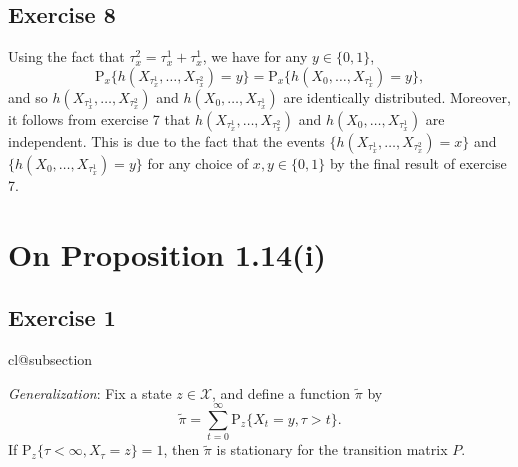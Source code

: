 \documentclass[12pt]{article}
\makeatletter
\def\nullstepcounter#1{%
	\begingroup
		\let\@elt\@stpelt
		\csname cl@#1\endcsname
	\endgroup}
\newcommand{\Prob}{\mathrm{P}}
\makeatother
\begin{document}
\subsection*{Exercise 8}

Using the fact that $\tau_x^2 = \tau_x^1 + \tau_x^1$, we have for any $y \in \{0, 1\}$,
\begin{equation*}
\Prob_x\{h(X_{\tau_x^1}, \ldots, X_{\tau_x^2}) = y\} = \Prob_x\{h(X_0, \ldots, X_{\tau_x^1}) = y\},
\end{equation*}
and so $h(X_{\tau_x^1}, \ldots, X_{\tau_x^2})$ and $h(X_0, \ldots, X_{\tau_x^1})$ are identically distributed. Moreover, it follows from exercise 7 that $h(X_{\tau_x^1}, \ldots, X_{\tau_x^2})$ and $h(X_0, \ldots, X_{\tau_x^1})$ are independent. This is due to the fact that the events $\{h(X_{\tau_x^1}, \ldots, X_{\tau_x^2}) = x\}$ and $\{h(X_0, \ldots, X_{\tau_x^1}) = y\}$ for any choice of $x, y \in \{0, 1\}$ by the final result of exercise 7.

\section*{On Proposition 1.14(i)}

\subsection*{Exercise 1}
\nullstepcounter{subsection}

\textit{Generalization}: Fix a state $z \in \mathcal{X}$, and define a function $\tilde{\pi}$ by
\begin{equation*}
\tilde{\pi} = \sum_{t=0}^\infty \Prob_z\{X_t = y, \tau > t\}.
\end{equation*}
If $\Prob_z\{\tau < \infty, X_\tau = z\} = 1$, then $\tilde{\pi}$ is stationary for the transition matrix $P$.
\end{document}
